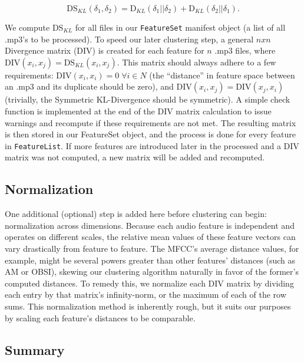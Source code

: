 \documentclass[12pt,twocolumn,titlepage]{article}
\begin{document}
\begin{equation}\label{}
\mathrm{DS}_{KL}(\delta_1, \delta_2) = \mathrm{D}_{KL}(\delta_1 || \delta_2) + \mathrm{D}_{KL}(\delta_2 || \delta_1).
\end{equation}


We compute $\mathrm{DS}_{KL}$ for all files in our \texttt{FeatureSet} manifest object (a list of all .mp3's to be processed). To speed our later clustering step, a general $nxn$ Divergence matrix (DIV) is created for each feature for $n$ .mp3 files, where $\mathrm{DIV}(x_i, x_j) = \mathrm{DS}_{KL}(x_i, x_j)$. This matrix should always adhere to a few requirements: $\mathrm{DIV}(x_i, x_i) = 0 \; \forall i \in N$ (the ``distance'' in feature space between an .mp3 and its duplicate should be zero), and $\mathrm{DIV}(x_i, x_j) = \mathrm{DIV}(x_j, x_i)$ (trivially, the Symmetric KL-Divergence should be symmetric). A simple check function is implemented at the end of the DIV matrix calculation to issue warnings and recompute if these requirements are not met. The resulting matrix is then stored in our FeatureSet object, and the process is done for every feature in \texttt{FeatureList}. If more features are introduced later in the processed and a DIV matrix was not computed, a new matrix will be added and recomputed. 

\subsection{Normalization}

One additional (optional) step is added here before clustering can begin: normalization across dimensions. Because each audio feature is independent and operates on different scales, the relative mean values of these feature vectors can vary drastically from feature to feature. The MFCC's average distance values, for example, might be several powers greater than other features' distances (such as AM or OBSI), skewing our clustering algorithm naturally in favor of the former's computed distances. To remedy this, we normalize each DIV matrix by dividing each entry by that matrix's infinity-norm, or the maximum of each of the row sums. \cite{Rudin} This normalization method is inherently rough, but it suits our purposes by scaling each feature's distances to be comparable.

\subsection{Summary}
\end{document}
